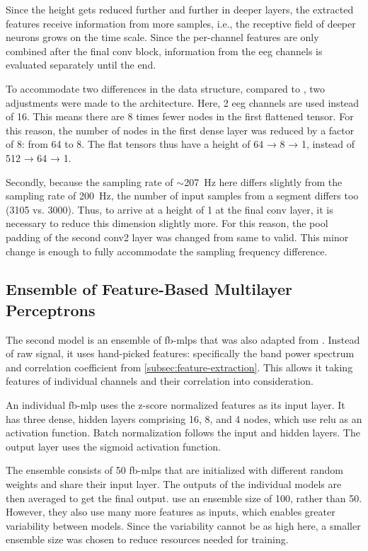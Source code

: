 Since the height gets reduced further and further in deeper layers, the extracted features receive information from more samples, i.e., the receptive field of deeper neurons grows on the time scale.
Since the per-channel features are only combined after the final conv block, information from the \gls{eeg} channels is evaluated separately until the end.

To accommodate two differences in the data structure, compared to \textcite{eberlein_convolutional_2018}, two adjustments were made to the architecture.
Here, 2 \gls{eeg} channels are used instead of 16.
This means there are 8 times fewer nodes in the first flattened tensor.
For this reason, the number of nodes in the first dense layer was reduced by a factor of 8: from 64 to 8.
The flat tensors thus have a height of 64 → 8 → 1, instead of 512 → 64 → 1.

Secondly, because the sampling rate of $\sim$\SI{207}{\Hz} here differs slightly from the sampling rate of \SI{200}{\Hz}, the number of input samples from a segment differs too (3105 vs. 3000).
Thus, to arrive at a height of 1 at the final conv layer, it is necessary to reduce this dimension slightly more.
For this reason, the pool padding of the second conv2 layer was changed from same to valid.
This minor change is enough to fully accommodate the sampling frequency difference.

\subsection{Ensemble of Feature-Based Multilayer Perceptrons}\label{subsec:ensemble-architecture}
The second model is an ensemble of \glspl{fb-mlp} that was also adapted from \textcite{muller_coherent_2022}.
Instead of raw signal, it uses hand-picked features: specifically the band power spectrum and correlation coefficient from \cref{subsec:feature-extraction}.
This allows it taking features of individual channels and their correlation into consideration.

An individual \gls{fb-mlp} uses the z-score normalized features as its input layer.
It has three dense, hidden layers comprising 16, 8, and 4 nodes, which use \gls{relu} as an activation function.
Batch normalization follows the input and hidden layers.
The output layer uses the sigmoid activation function.

The ensemble consists of 50 \glspl{fb-mlp} that are initialized with different random weights and share their input layer.
The outputs of the individual models are then averaged to get the final output.
\Textcite{muller_coherent_2022} use an ensemble size of 100, rather than 50.
However, they also use many more features as inputs, which enables greater variability between models.
Since the variability cannot be as high here, a smaller ensemble size was chosen to reduce resources needed for training.

